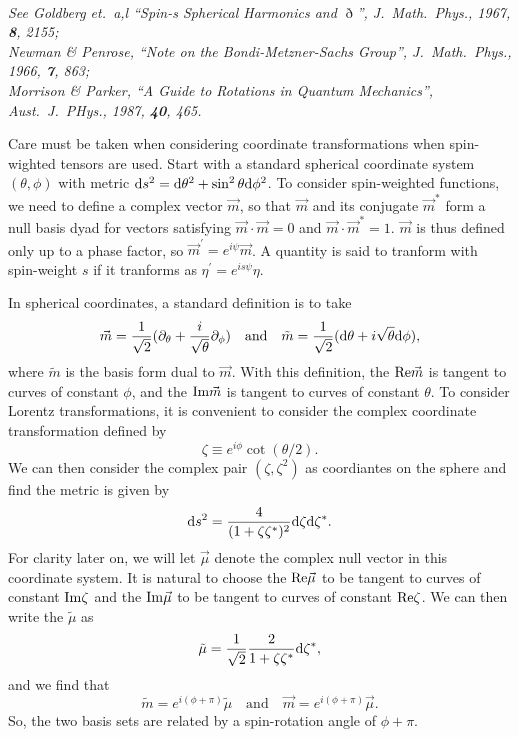 \documentclass[11pt]{article}
\begin{document}
\newpage
{}\\ {\em See Goldberg et.\ a,l
  ``Spin-s Spherical Harmonics and $\eth$'', J.\ Math.\ Phys., 1967,
  {\bf 8}, 2155;\\ Newman \& Penrose, ``Note on the
  Bondi-Metzner-Sachs Group'', J.\ Math.\ Phys., 1966, {\bf 7}, 863;\\
  Morrison \& Parker, ``A Guide to Rotations in Quantum Mechanics'',
  Aust.\ J.\ PHys., 1987, {\bf 40}, 465.}
\vspace{0.25in}

Care must be taken when considering coordinate transformations when
spin-wighted tensors are used.  Start with a standard spherical
coordinate system $(\theta,\phi)$ with metric ${\rm d}s^2={\rm
  d}\theta^2+\sin^2\theta{\rm d}\phi^2$.  To consider spin-weighted
functions, we need to define a complex vector $\vec{m}$, so that
$\vec{m}$ and its conjugate $\vec{m}^*$ form a null basis dyad for
vectors satisfying $\vec{m}\cdot\vec{m}=0$ and
$\vec{m}\cdot\vec{m}^*=1$.  $\vec{m}$ is thus defined only up to a
phase factor, so $\vec{m}^\prime=e^{i\psi}\vec{m}$.  A quantity is
said to tranform with spin-weight $s$ if it tranforms as
$\eta^\prime=e^{is\psi}\eta$.

In spherical coordinates, a standard definition is to take
\begin{equation}
  \vec{m} = \frac1{\sqrt2}(\partial_\theta + \frac{i}{\sqrt\theta}\partial_\phi)
\quad\mbox{and}\quad
  \tilde{m} = \frac1{\sqrt2}({\rm d}\theta + i\sqrt\theta{\rm d}\phi),
\end{equation}
where $\tilde{m}$ is the basis form dual to $\vec{m}$.  With this
definition, the ${\rm Re}{\vec{m}}$ is tangent to curves of constant
$\phi$, and the ${\rm Im}{\vec{m}}$ is tangent to curves of constant
$\theta$.  To consider Lorentz transformations, it is convenient to
consider the complex coordinate transformation defined by
\begin{equation}
  \zeta\equiv e^{i\phi}\cot(\theta/2).
\end{equation}
We can then consider the complex pair $(\zeta,\zeta^2)$ as coordiantes
on the sphere and find the metric is given by
\begin{equation}
{\rm d}s^2 = \frac4{(1+\zeta\zeta^*)^2}{\rm d}\zeta{\rm d}\zeta^*.
\end{equation}
For clarity later on, we will let $\vec\mu$ denote the complex null
vector in this coordinate system.  It is natural to choose the ${\rm
  Re}{\vec\mu}$ to be tangent to curves of constant ${\rm Im}\zeta$
and the ${\rm Im}{\vec\mu}$ to be tangent to curves of constant ${\rm
  Re}\zeta$.  We can then write the $\tilde\mu$ as
\begin{equation}
  \tilde\mu = \frac1{\sqrt2}\frac2{1+\zeta\zeta^*}{\rm d}\zeta^*,
\end{equation}
and we find that
\begin{equation}
  \tilde{m} = e^{i(\phi+\pi)}\tilde\mu
\quad\mbox{and}\quad \vec{m} = e^{i(\phi+\pi)}\vec\mu.
\end{equation}
So, the two basis sets are related by a spin-rotation angle of $\phi+\pi$.
\end{document}
